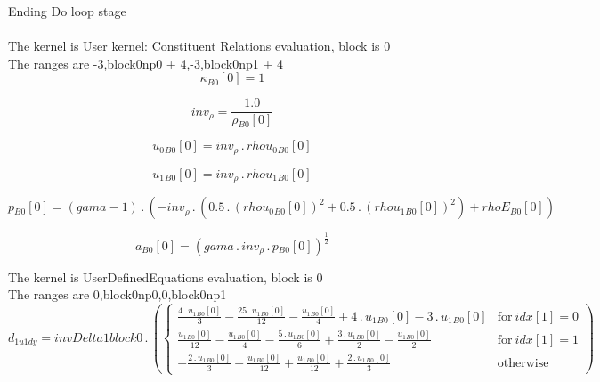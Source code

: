 \documentclass{article}
\begin{document}
\noindent Ending Do loop stage\\
\\\noindent The kernel is User kernel: Constituent Relations evaluation, block is 0\\\noindent The ranges are -3,block0np0 + 4,-3,block0np1 + 4\\\begin{dmath}{\kappa{_{B0}}}[{0}] = 1\end{dmath}

\begin{dmath}inv_{\rho} = \frac{1.0}{{\rho{_{B0}}}[{0}]}\end{dmath}

\begin{dmath}{u_{0}{_{B0}}}[{0}] = inv_{\rho} \,.\, {rhou_{0}{_{B0}}}[{0}]\end{dmath}

\begin{dmath}{u_{1}{_{B0}}}[{0}] = inv_{\rho} \,.\, {rhou_{1}{_{B0}}}[{0}]\end{dmath}

\begin{dmath}{p{_{B0}}}[{0}] = \left(gama - 1\right) \,.\, \left(- inv_{\rho} \,.\, \left(0.5 \,.\, \left({rhou_{0}{_{B0}}}[{0}] \right)^{2} + 0.5 \,.\, \left({rhou_{1}{_{B0}}}[{0}] \right)^{2}\right) + {rhoE{_{B0}}}[{0}]\right)\end{dmath}

\begin{dmath}{a{_{B0}}}[{0}] = \left(gama \,.\, inv_{\rho} \,.\, {p{_{B0}}}[{0}] \right)^{\frac{1}{2}}\end{dmath}

\noindent The kernel is UserDefinedEquations evaluation, block is 0\\\noindent The ranges are 0,block0np0,0,block0np1\\\begin{dmath}d_{1 u1 dy} = invDelta1block0 \,.\, \left(\begin{cases} \frac{4 \,.\, {u_{1}{_{B0}}}[{0}]}{3} - \frac{25 \,.\, {u_{1}{_{B0}}}[{0}]}{12} - \frac{{u_{1}{_{B0}}}[{0}]}{4} + 4 \,.\, {u_{1}{_{B0}}}[{0}] - 3 \,.\, {u_{1}{_{B0}}}[{0}] & 
\text{for}\: {idx}[{1}] = 0 \\\frac{{u_{1}{_{B0}}}[{0}]}{12} - \frac{{u_{1}{_{B0}}}[{0}]}{4} - \frac{5 \,.\, {u_{1}{_{B0}}}[{0}]}{6} + \frac{3 \,.\, {u_{1}{_{B0}}}[{0}]}{2} - \frac{{u_{1}{_{B0}}}[{0}]}{2} & \text{for}\: {idx}[{1}] = 1 \\- \frac{2 
\,.\, {u_{1}{_{B0}}}[{0}]}{3} - \frac{{u_{1}{_{B0}}}[{0}]}{12} + \frac{{u_{1}{_{B0}}}[{0}]}{12} + \frac{2 \,.\, {u_{1}{_{B0}}}[{0}]}{3} & \text{otherwise} \end{cases}\right)\end{dmath}
\end{document}
